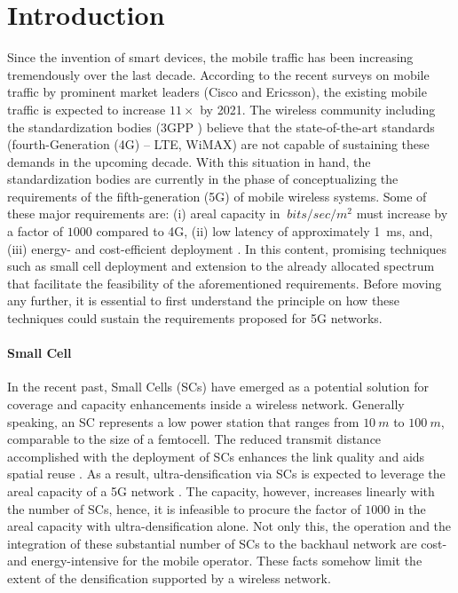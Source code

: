 \chapter{Introduction}

Since the invention of smart devices, the mobile traffic has been increasing tremendously over the last decade. According to the recent surveys on mobile traffic by prominent market leaders (Cisco \cite{CISCO14} and Ericsson\cite{Eric15}), the existing mobile traffic is expected to increase $11 \times$ by 2021. The wireless community including the standardization bodies (3GPP \cite{3GPP}) believe that the state-of-the-art standards (fourth-Generation (4G) -- LTE, WiMAX) are not capable of sustaining these demands in the upcoming decade. With this situation in hand, the standardization bodies are currently in the phase of conceptualizing the requirements of the fifth-generation (5G) of mobile wireless systems.
Some of these major requirements are: (i) areal capacity in $\SI{}{bits/sec/m^2}$ must increase by a factor of $1000$ compared to 4G, (ii) low latency of approximately \SI{1}{ms}, and, (iii) energy- and cost-efficient deployment \cite{Qual13, Andrews14}.
In this content, promising techniques such as small cell deployment and extension to the already allocated spectrum that facilitate the feasibility of the aforementioned requirements. Before moving any further, it is essential to first understand the principle on how these techniques could sustain the requirements proposed for 5G networks. 

\subsubsection*{Small Cell}

In the recent past, Small Cells (SCs) have emerged as a potential solution for coverage and capacity enhancements inside a wireless network. Generally speaking, an SC represents a low power station that ranges from $\SI{10}{m}$ to $\SI{100}{m}$, comparable to the size of a femtocell. The reduced transmit distance accomplished with the deployment of SCs enhances the link quality and aids spatial reuse \cite{Chander08}.
As a result, ultra-densification via SCs is expected to leverage the areal capacity of a 5G network \cite{Andrews14}. The capacity, however, increases linearly with the number of SCs, hence, it is infeasible to procure the factor of $1000$ in the areal capacity with ultra-densification alone. Not only this, the operation and the integration of these substantial number of SCs to the backhaul network are cost- and energy-intensive for the mobile operator. These facts somehow limit the extent of the densification supported by a wireless network.





